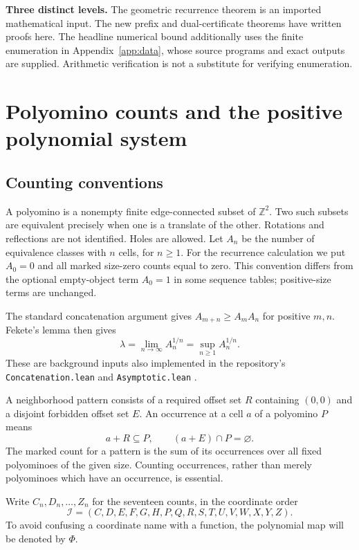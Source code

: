 \documentclass[11pt,a4paper]{article}
\theoremstyle{definition}
\theoremstyle{remark}
\newcommand{\Z}{\mathbb Z}
\begin{document}
\begin{resultbox}
\textbf{Three distinct levels.}
The geometric recurrence theorem is an imported mathematical input.
The new prefix and dual-certificate theorems have written proofs here.
The headline numerical bound additionally uses the finite enumeration in
Appendix~\ref{app:data}, whose source programs and exact outputs are supplied.
Arithmetic verification is not a substitute for verifying enumeration.
\end{resultbox}

\section{Polyomino counts and the positive polynomial system}
\label{sec:system}

\subsection{Counting conventions}
A polyomino is a nonempty finite edge-connected subset of $\Z^2$.
Two such subsets are equivalent precisely when one is a translate of the
other. Rotations and reflections are not identified. Holes are allowed.
Let $A_n$ be the number of equivalence classes with $n$ cells, for $n\geq1$.
For the recurrence calculation we put $A_0=0$ and all marked size-zero
counts equal to zero. This convention differs from the optional empty-object
term $A_0=1$ in some sequence tables; positive-size terms are unchanged.

The standard concatenation argument gives $A_{m+n}\geq A_mA_n$ for positive
$m,n$. Fekete's lemma then gives
\begin{equation}\label{eq:lambda}
 \lambda=\lim_{n\to\infty}A_n^{1/n}=\sup_{n\geq1}A_n^{1/n}.
\end{equation}
These are background inputs also implemented in the repository's
\texttt{Concatenation.lean} and \texttt{Asymptotic.lean}
\cite{bui,reporeadme,repocomplete}.

A neighborhood pattern consists of a required offset set $R$ containing
$(0,0)$ and a disjoint forbidden offset set $E$. An occurrence at a cell $a$
of a polyomino $P$ means
\[
 a+R\subseteq P,\qquad (a+E)\cap P=\varnothing.
\]
The marked count for a pattern is the sum of its occurrences over all fixed
polyominoes of the given size. Counting occurrences, rather than merely
polyominoes which have an occurrence, is essential.

Write $C_n,D_n,\ldots,Z_n$ for the seventeen counts, in the coordinate order
\begin{equation}\label{eq:order}
 \mathcal I=(C,D,E,F,G,H,P,Q,R,S,T,U,V,W,X,Y,Z).
\end{equation}
To avoid confusing a coordinate name with a function, the polynomial map
will be denoted by $\Phi$.
\end{document}
